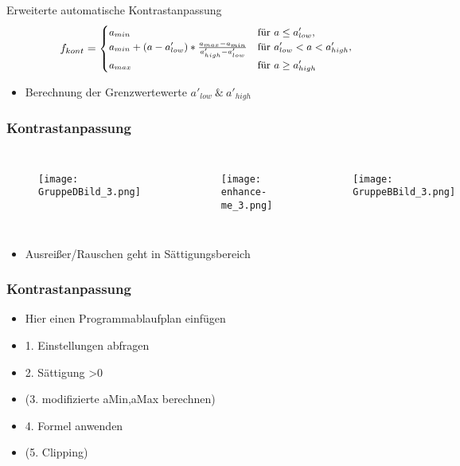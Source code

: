 \documentclass[14pt]{beamer}
\begin{document}
\begin{frame}
	\begin{block}{Erweiterte automatische Kontrastanpassung}	
		\begin{equation*}
		\small{
			f_{kont}=
			\begin{cases}
			a_{min}   			& \text{für } a \leq a'_{low}, \\
			a_{min} + (a-a'_{low})*\frac{a_{max}-a_{min}}{a'_{high}-a'_{low}}	& \text{für } a'_{low} < a < a'_{high}, \\
			a_{max}        		& \text{für } a \geq a'_{high}
			\end{cases}
		}
		\end{equation*}
	\end{block}
	\begin{itemize}
		\item Berechnung der Grenzwertewerte $a'_{low}\ \&\ a'_{high}$
	\end{itemize}

\end{frame}

\begin{frame}
	\frametitle{Kontrastanpassung}
	\begin{columns}[c]
		\begin{figure}
			\texttt{[image: GruppeDBild\_3.png]}
		\end{figure}
		\begin{figure}
			\texttt{[image: enhance-me\_3.png]}
		\end{figure}
		\begin{figure}
			\texttt{[image: GruppeBBild\_3.png]}
		\end{figure}		 	
	\end{columns}	
	\begin{itemize}
		\item Ausreißer/Rauschen geht in Sättigungsbereich
	\end{itemize}
\end{frame}

\begin{frame}
	\frametitle{Kontrastanpassung}
	\begin{itemize}
		\item Hier einen Programmablaufplan einfügen
		\item 1. Einstellungen abfragen
		\item 2. Sättigung >0%
		\item (3. modifizierte aMin,aMax berechnen)
		\item 4. Formel anwenden
		\item (5. Clipping)
	\end{itemize}
\end{frame}
\end{document}
